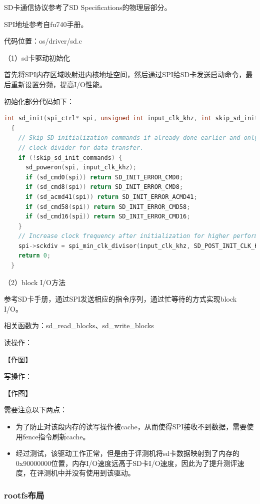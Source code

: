 \documentclass[UTF8,a4paper,10pt]{ctexart}
\begin{document}
SD卡通信协议参考了SD Specifications的物理层部分。

SPI地址参考自fu740手册。

代码位置：os/driver/sd.c

（1）sd卡驱动初始化

首先将SPI内存区域映射进内核地址空间，然后通过SPI给SD卡发送启动命令，最后重新设置分频，提高I/O性能。

初始化部分代码如下：

\begin{lstlisting}[title=sd卡驱动初始化,frame=trbl,language={C}]
  int sd_init(spi_ctrl* spi, unsigned int input_clk_khz, int skip_sd_init_commands)
  {
    // Skip SD initialization commands if already done earlier and only set the
    // clock divider for data transfer.
    if (!skip_sd_init_commands) {
      sd_poweron(spi, input_clk_khz);
      if (sd_cmd0(spi)) return SD_INIT_ERROR_CMD0;
      if (sd_cmd8(spi)) return SD_INIT_ERROR_CMD8;
      if (sd_acmd41(spi)) return SD_INIT_ERROR_ACMD41;
      if (sd_cmd58(spi)) return SD_INIT_ERROR_CMD58;
      if (sd_cmd16(spi)) return SD_INIT_ERROR_CMD16;
    }
    // Increase clock frequency after initialization for higher performance.
    spi->sckdiv = spi_min_clk_divisor(input_clk_khz, SD_POST_INIT_CLK_KHZ);
    return 0;
  }
  \end{lstlisting}

（2）block I/O方法

参考SD卡手册，通过SPI发送相应的指令序列，通过忙等待的方式实现block I/O。

相关函数为：sd\_read\_blocks、sd\_write\_blocks

读操作：

【作图】

写操作：

【作图】

需要注意以下两点：

\begin{itemize}
  \item 为了防止对该段内存的读写操作被cache，从而使得SPI接收不到数据，需要使用fence指令刷新cache。
  \item 经过测试，该驱动工作正常，但是由于评测机将sd卡数据映射到了内存的0x90000000位置，内存I/O速度远高于SD卡I/O速度，因此为了提升测评速度，在评测机中并没有使用到该驱动。
\end{itemize}

\subsubsection{rootfs布局}
\end{document}
